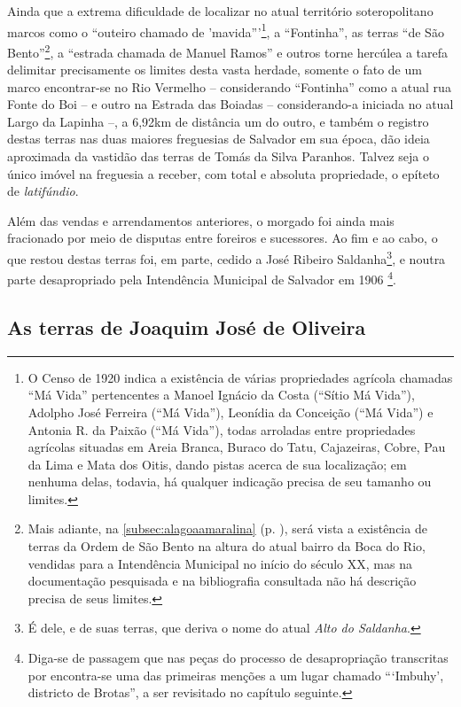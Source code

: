 Ainda que a extrema dificuldade de localizar no atual território soteropolitano marcos como o ``outeiro chamado de 'mavida'''\footnote{O Censo de 1920 indica a existência de várias propriedades agrícola chamadas ``Má Vida'' pertencentes a Manoel Ignácio da Costa (``Sítio Má Vida''), Adolpho José Ferreira (``Má Vida''), Leonídia da Conceição (``Má Vida'') e Antonia R. da Paixão (``Má Vida''), todas arroladas entre propriedades agrícolas situadas em Areia Branca, Buraco do Tatu, Cajazeiras, Cobre, Pau da Lima e Mata dos Oitis, dando pistas acerca de sua localização; em nenhuma delas, todavia, há qualquer indicação precisa de seu tamanho ou limites.}, a ``Fontinha'', as terras ``de São Bento''\footnote{Mais adiante, na \autoref{subsec:alagoaamaralina} (p. \pageref{subsec:alagoaamaralina}), será vista a existência de terras da Ordem de São Bento na altura do atual bairro da Boca do Rio, vendidas para a Intendência Municipal no início do século XX, mas na documentação pesquisada e na bibliografia consultada não há descrição precisa de seus limites.}, a ``estrada chamada de Manuel Ramos'' e outros torne hercúlea a tarefa  delimitar precisamente os limites desta vasta herdade, somente o fato de um marco encontrar-se no Rio Vermelho -- considerando ``Fontinha'' como a atual rua Fonte do Boi -- e outro na Estrada das Boiadas -- considerando-a iniciada no atual Largo da Lapinha --, a 6,92km de distância um do outro, e também o registro destas terras nas duas maiores freguesias de Salvador em sua época, dão ideia aproximada da vastidão das terras de Tomás da Silva Paranhos. Talvez seja o único imóvel na freguesia a receber, com total e absoluta propriedade, o epíteto de \textit{latifúndio}.  

Além das vendas e arrendamentos anteriores, o morgado foi ainda mais fracionado por meio de disputas entre foreiros e sucessores. Ao fim e ao cabo, o que restou destas terras foi, em parte, cedido a José Ribeiro Saldanha\footnote{É dele, e de suas terras, que deriva o nome do atual \textit{Alto do Saldanha}.}, e noutra parte desapropriado pela Intendência Municipal de Salvador em 1906 \cite[p.~III-13 - III-14]{teixeira_doacoes_1978}\footnote{Diga-se de passagem que nas peças do processo de desapropriação transcritas por  encontra-se uma das primeiras menções a um lugar chamado ```Imbuhy', districto de Brotas'', a ser revisitado no capítulo seguinte.}.

\subsection{As terras de Joaquim José de Oliveira}\label{subsec:josejoaquim}

